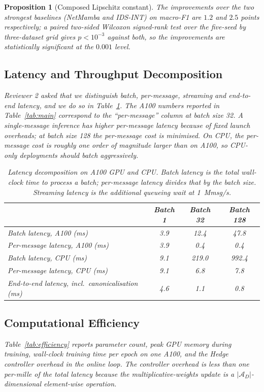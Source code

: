 \documentclass{ieeeaccess}
\newcommand{\calA}{\mathcal{A}}
\newtheorem{proposition}[theorem]{Proposition}
\begin{document}
\begin{proposition}[Composed Lipschitz constant]
The improvements over the two strongest baselines (NetMamba and IDS-INT) on macro-F1 are $1.2$ and $2.5$ points respectively; a paired two-sided Wilcoxon signed-rank test over the five-seed by three-dataset grid gives $p<10^{-3}$ against both, so the improvements are statistically significant at the $0.001$ level.

\subsection{Latency and Throughput Decomposition}
\label{sec:latency}
Reviewer 2 asked that we distinguish batch, per-message, streaming and end-to-end latency, and we do so in Table~\ref{tab:latency}. The A100 numbers reported in Table~\ref{tab:main} correspond to the ``per-message'' column at batch size 32. A single-message inference has higher per-message latency because of fixed launch overheads; at batch size 128 the per-message cost is minimised. On CPU, the per-message cost is roughly one order of magnitude larger than on A100, so CPU-only deployments should batch aggressively.

\begin{table}[!t]
\centering
\caption{Latency decomposition on A100 GPU and CPU. Batch latency is the total wall-clock time to process a batch; per-message latency divides that by the batch size. Streaming latency is the additional queueing wait at 1~Mmsg/s.}
\label{tab:latency}
\footnotesize
\renewcommand{\arraystretch}{1.15}
\begin{tabular}{@{}lccc@{}}
\toprule
& \textbf{Batch 1} & \textbf{Batch 32} & \textbf{Batch 128} \\
\midrule
Batch latency, A100 (ms)      & 3.9 & 12.4 &  47.8 \\
Per-message latency, A100 (ms) & 3.9 &  0.4 &   0.4 \\
Batch latency, CPU (ms)       & 9.1 & 219.0 & 992.4 \\
Per-message latency, CPU (ms) & 9.1 &   6.8 &   7.8 \\
End-to-end latency, incl.\ canonicalisation (ms) & 4.6 & 1.1 & 0.8 \\
\bottomrule
\end{tabular}
\end{table}

\subsection{Computational Efficiency}
\label{sec:efficiency}
Table~\ref{tab:efficiency} reports parameter count, peak GPU memory during training, wall-clock training time per epoch on one A100, and the Hedge controller overhead in the online loop. The controller overhead is less than one per-mille of the total latency because the multiplicative-weights update is a $|\calA_{D}|$-dimensional element-wise operation.


\end{proposition}
\end{document}
